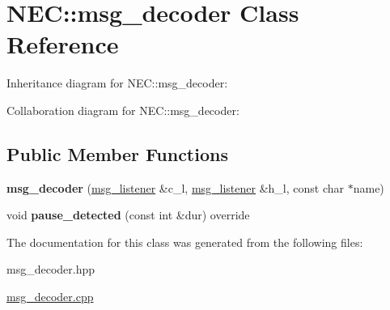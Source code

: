 \hypertarget{classNEC_1_1msg__decoder}{}\section{N\+EC\+:\+:msg\+\_\+decoder Class Reference}
\label{classNEC_1_1msg__decoder}


Inheritance diagram for N\+EC\+:\+:msg\+\_\+decoder\+:


Collaboration diagram for N\+EC\+:\+:msg\+\_\+decoder\+:
\subsection*{Public Member Functions}
\begin{DoxyCompactItemize}
\item 
\mbox{\label{classNEC_1_1msg__decoder_ad253aa73bfa97dc50391716604b7029f}} 
{\bfseries msg\+\_\+decoder} (\hyperlink{classNEC_1_1msg__listener}{msg\+\_\+listener} \&c\+\_\+l, \hyperlink{classNEC_1_1msg__listener}{msg\+\_\+listener} \&h\+\_\+l, const char $\ast$name)
\item 
\mbox{\label{classNEC_1_1msg__decoder_a50cd72c5ec692db3c907ea5d7a36343f}} 
void {\bfseries pause\+\_\+detected} (const int \&dur) override
\end{DoxyCompactItemize}


The documentation for this class was generated from the following files\+:\begin{DoxyCompactItemize}
\item 
msg\+\_\+decoder.\+hpp\item 
\hyperlink{msg__decoder_8cpp}{msg\+\_\+decoder.\+cpp}\end{DoxyCompactItemize}
